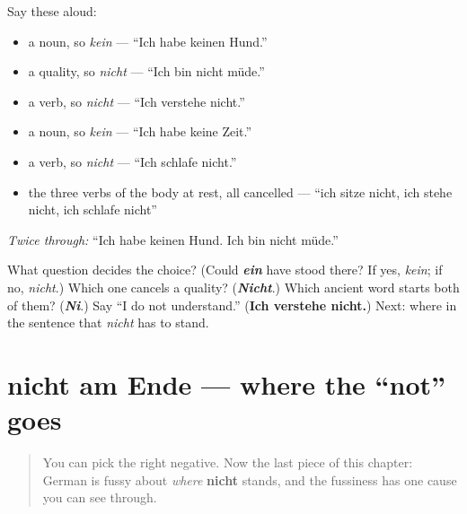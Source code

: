 Say these aloud:

\begin{itemize}
\raggedright
  \item a noun, so \emph{kein} — \textquotedblleft{}Ich habe keinen Hund.\textquotedblright{}
  \item a quality, so \emph{nicht} — \textquotedblleft{}Ich bin nicht müde.\textquotedblright{}
  \item a verb, so \emph{nicht} — \textquotedblleft{}Ich verstehe nicht.\textquotedblright{}
  \item a noun, so \emph{kein} — \textquotedblleft{}Ich habe keine Zeit.\textquotedblright{}
  \item a verb, so \emph{nicht} — \textquotedblleft{}Ich schlafe nicht.\textquotedblright{}
  \item the three verbs of the body at rest, all cancelled — \textquotedblleft{}ich sitze nicht, ich stehe nicht, ich schlafe nicht\textquotedblright{}
\end{itemize}

\emph{Twice through:} \textquotedblleft{}Ich habe keinen Hund. Ich bin nicht müde.\textquotedblright{}

\begin{tcolorbox}[breakable,colback=teal!4,colframe=teal!35!black,title={Before you move on}]
What question decides the choice? (Could \emph{\textbf{ein}} have stood there? If yes, \emph{kein}; if no, \emph{nicht}.) Which one cancels a quality? (\emph{\textbf{Nicht}}.) Which ancient word starts both of them? (\emph{\textbf{Ni}}.) Say \textquotedblleft{}I do not understand.\textquotedblright{} (\textbf{Ich verstehe nicht.}) Next: where in the sentence that \emph{nicht} has to stand.
\end{tcolorbox}
\section[nicht am Ende]{nicht am Ende — where the \textquotedblleft{}not\textquotedblright{} goes}

\label{lesson:GE-C32-nicht-stellung}



\begin{quote}
You can pick the right negative. Now the last piece of this chapter: German is fussy about \emph{where} \textbf{nicht} stands, and the fussiness has one cause you can see through.
\end{quote}

